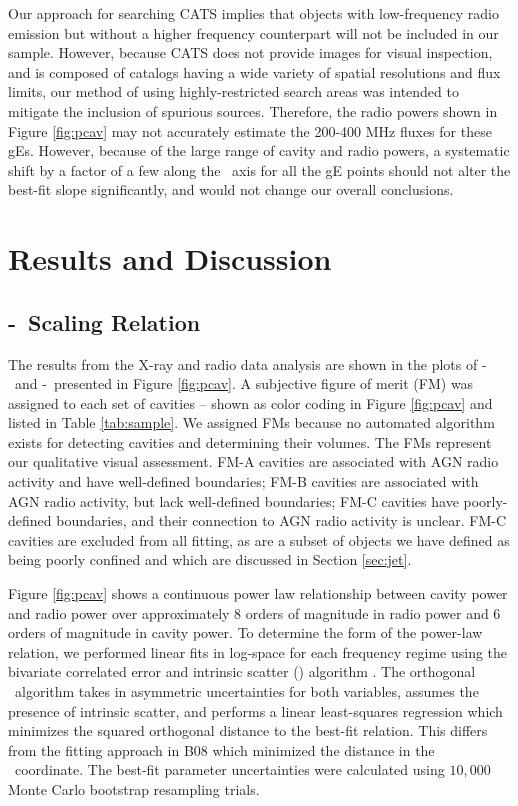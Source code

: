 \documentclass{emulateapj}
\begin{document}
Our approach for searching CATS implies that objects with
low-frequency radio emission but without a higher frequency
counterpart will not be included in our sample. However, because CATS
does not provide images for visual inspection, and is composed of
catalogs having a wide variety of spatial resolutions and flux limits,
our method of using highly-restricted search areas was intended to
mitigate the inclusion of spurious sources. Therefore, the radio
powers shown in Figure \ref{fig:pcav} may not accurately estimate the
200-400 MHz fluxes for these gEs. However, because of the large range
of cavity and radio powers, a systematic shift by a factor of a few
along the \prad\ axis for all the gE points should not alter the
best-fit slope significantly, and would not change our overall
conclusions.

\section{Results and Discussion}
\label{sec:r&d}

\subsection{\pjet-\prad\ Scaling Relation}
\label{sec:relation}

The results from the X-ray and radio data analysis are shown in the
plots of \pcav-\phigh\ and \pcav-\plow\ presented in Figure
\ref{fig:pcav}. A subjective figure of merit (FM) was assigned to each
set of cavities -- shown as color coding in Figure \ref{fig:pcav} and
listed in Table \ref{tab:sample}. We assigned FMs because no automated
algorithm exists for detecting cavities and determining their
volumes. The FMs represent our qualitative visual assessment. FM-A
cavities are associated with AGN radio activity and have well-defined
boundaries; FM-B cavities are associated with AGN radio activity, but
lack well-defined boundaries; FM-C cavities have poorly-defined
boundaries, and their connection to AGN radio activity is
unclear. FM-C cavities are excluded from all fitting, as are a subset
of objects we have defined as being poorly confined and which are
discussed in Section \ref{sec:jet}.

Figure \ref{fig:pcav} shows a continuous power law relationship
between cavity power and radio power over approximately 8 orders of
magnitude in radio power and 6 orders of magnitude in cavity power. To
determine the form of the power-law relation, we performed linear fits
in log-space for each frequency regime using the bivariate correlated
error and intrinsic scatter (\bces) algorithm \citep{bces}. The
orthogonal \bces\ algorithm takes in asymmetric uncertainties for both
variables, assumes the presence of intrinsic scatter, and performs a
linear least-squares regression which minimizes the squared orthogonal
distance to the best-fit relation. This differs from the fitting
approach in B08 which minimized the distance in the
\pcav\ coordinate. The best-fit parameter uncertainties were
calculated using $10,000$ Monte Carlo bootstrap resampling trials.
\end{document}
